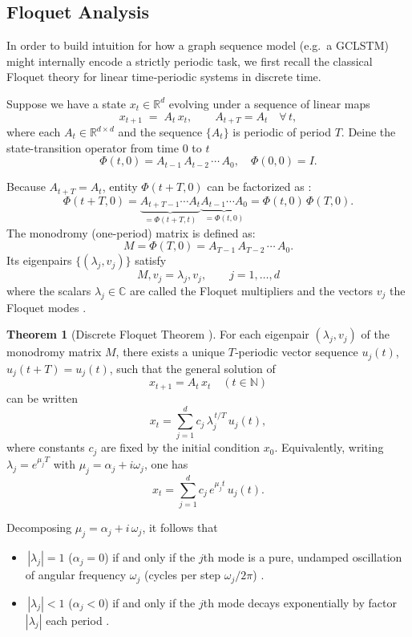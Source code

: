 \documentclass{article}
\theoremstyle{remark}
\theoremstyle{definition}
\newtheorem{theorem}{Theorem}[section]
\begin{document}
\subsection{Floquet Analysis} \label{seq:step4}


In order to build intuition for how a graph sequence model (e.g.\ a GCLSTM) might internally encode a strictly periodic task, we first recall the classical Floquet theory for linear time‐periodic systems in discrete time.

Suppose we have a state \(x_{t}\in\mathbb{R}^{d}\) evolving under a sequence of linear maps
\[
  x_{t+1} \;=\; A_{t}\,x_{t},
  \qquad
  A_{t+T} = A_{t}
  \quad\forall\,t,
\]
where each \(A_{t}\in\mathbb{R}^{d\times d}\) and the sequence \(\{A_{t}\}\) is periodic of period \(T\). Deine the state-transition operator from time $0$ to $t$
\[
  \Phi(t,0)
  = A_{t-1}\,A_{t-2}\,\cdots\,A_{0},
  \quad
  \Phi(0,0)=I.
\]

Because \(A_{t+T}=A_{t}\), entity \(\Phi(t+T,0)\) can be factorized as \citep{Floquet1883, BellmanCooke1963} :
\[
  \Phi(t+T,0) 
  = \underbrace{A_{t+T-1}\cdots A_{t}}_{= \Phi(t+T,t)}
    \underbrace{A_{t-1}\cdots A_{0}}_{= \Phi(t,0)}
  = \Phi(t,0)\,\Phi(T,0).
\]
The monodromy (one-period) matrix is defined as:
\begin{equation}
  M = \Phi(T,0) 
  = A_{T-1}\,A_{T-2}\,\cdots\,A_{0}.
  \label{eq:monodromy_general}
\end{equation}
Its eigenpairs \(\{(\lambda_j,v_j)\}\) satisfy
\[
  M, v_j = \lambda_j, v_j,
  \qquad j=1,\dots,d
\]
where the scalars \(\lambda_j\in\mathbb{C}\) are called the Floquet multipliers and the vectors \(v_j\) the Floquet modes \citep{YakubovichStarzhinskii1975,Chen1999}.

\begin{theorem}[Discrete Floquet Theorem \citep{YakubovichStarzhinskii1975}]
For each eigenpair \((\lambda_j,v_j)\) of the monodromy matrix \(M\), there exists a unique \(T\)‐periodic vector sequence \(u_j(t)\), \(u_j(t+T)=u_j(t)\), such that the general solution of
\[
  x_{t+1} = A_{t}\,x_{t}
  \quad(t\in\mathbb{N})
\]
can be written
\[
  x_{t}
  = \sum_{j=1}^{d}
    c_j\,\lambda_j^{\,t/T}\,u_j(t),
\]
where constants \(c_j\) are fixed by the initial condition \(x_0\). Equivalently, writing \(\lambda_j=e^{\mu_j T}\) with \(\mu_j=\alpha_j+i\omega_j\), one has
\[
  x_t = \sum_{j=1}^d c_j\,e^{\mu_j t}\,u_j(t).
\]
\end{theorem}

Decomposing \(\mu_j=\alpha_j + i\,\omega_j\), it follows that
\begin{itemize}
  \item \(\,|\lambda_j|=1\) (\(\alpha_j=0\)) if and only if the \(j\)th mode is a pure, undamped oscillation of angular frequency \(\omega_j\) (cycles per step \(\omega_j/2\pi\)) \citep{BellmanCooke1963}.
  \item \(\,|\lambda_j|<1\) (\(\alpha_j<0\)) if and only if the \(j\)th mode decays exponentially by factor \(|\lambda_j|\) each period \citep{CoddingtonLevinson1955}.
\end{itemize}
\end{document}
